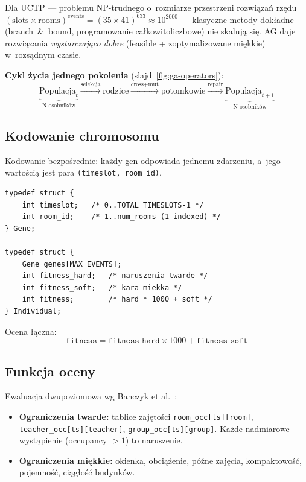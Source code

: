 \documentclass{common/sprawozdanie-agh}
\begin{document}
Dla UCTP --- problemu NP-trudnego o~rozmiarze przestrzeni rozwiązań rzędu $(\text{slots}\times\text{rooms})^{\text{events}} = (35\times41)^{633} \approx 10^{2000}$ --- klasyczne metody dokładne (branch~\&~bound, programowanie całkowitoliczbowe) nie skalują się. AG daje rozwiązania \emph{wystarczająco dobre} (feasible + zoptymalizowane miękkie) w~rozsądnym czasie.

\textbf{Cykl życia jednego pokolenia} (slajd~\ref{fig:ga-operators}):
\[
\underbrace{\text{Populacja}_t}_{\text{N osobników}}
\xrightarrow{\text{selekcja}}
\text{rodzice}
\xrightarrow{\text{cross+mut}}
\text{potomkowie}
\xrightarrow{\text{repair}}
\underbrace{\text{Populacja}_{t+1}}_{\text{N osobników}}
\]

\subsection{Kodowanie chromosomu}

Kodowanie bezpośrednie: każdy gen odpowiada jednemu zdarzeniu, a~jego wartością jest para \texttt{(timeslot, room\_id)}.

\begin{lstlisting}[style=cstyle, caption={Struktury danych chromosomu (types.h)}]
typedef struct {
    int timeslot;   /* 0..TOTAL_TIMESLOTS-1 */
    int room_id;    /* 1..num_rooms (1-indexed) */
} Gene;

typedef struct {
    Gene genes[MAX_EVENTS];
    int fitness_hard;   /* naruszenia twarde */
    int fitness_soft;   /* kara miekka */
    int fitness;        /* hard * 1000 + soft */
} Individual;
\end{lstlisting}

Ocena łączna:
\begin{equation}
    \texttt{fitness} = \texttt{fitness\_hard} \times 1000 + \texttt{fitness\_soft}
\end{equation}

\subsection{Funkcja oceny}

Ewaluacja dwupoziomowa wg Banczyk et al.~\cite{banczyk}:

\begin{itemize}
    \item \textbf{Ograniczenia twarde:} tablice zajętości \texttt{room\_occ[ts][room]}, \texttt{teacher\_occ[ts][teacher]}, \texttt{group\_occ[ts][group]}. Każde nadmiarowe wystąpienie (occupancy $> 1$) to naruszenie.
    \item \textbf{Ograniczenia miękkie:} okienka, obciążenie, późne zajęcia, kompaktowość, pojemność, ciągłość budynków.
\end{itemize}
\end{document}
